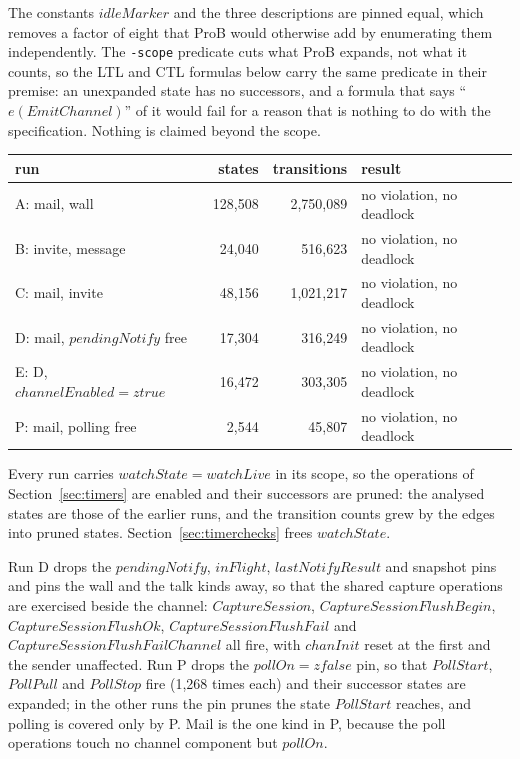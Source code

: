 \documentclass[a4paper,10pt,fleqn]{article}
\begin{document}
The constants $idleMarker$ and the three descriptions are pinned equal, which
removes a factor of eight that ProB would otherwise add by enumerating them
independently.  The \texttt{-scope} predicate cuts what ProB expands, not what
it counts, so the LTL and CTL formulas below carry the same predicate in
their premise: an unexpanded state has no successors, and a formula that
says ``$e(EmitChannel)$'' of it would fail for a reason that is nothing to do
with the specification.  Nothing is claimed beyond the scope.

\begin{center}
\begin{tabular}{lrrl}
  run & states & transitions & result \\ \hline
  A: mail, wall & 128{,}508 & 2{,}750{,}089 & no violation, no deadlock \\
  B: invite, message & 24{,}040 & 516{,}623 & no violation, no deadlock \\
  C: mail, invite & 48{,}156 & 1{,}021{,}217 & no violation, no deadlock \\
  D: mail, $pendingNotify$ free & 17{,}304 & 316{,}249 &
    no violation, no deadlock \\
  E: D, $channelEnabled = ztrue$ & 16{,}472 & 303{,}305 &
    no violation, no deadlock \\
  P: mail, polling free & 2{,}544 & 45{,}807 & no violation, no deadlock \\
\end{tabular}
\end{center}

Every run carries $watchState = watchLive$ in its scope, so the operations of
Section~\ref{sec:timers} are enabled and their successors are pruned: the
analysed states are those of the earlier runs, and the transition counts grew
by the edges into pruned states.  Section~\ref{sec:timerchecks} frees
$watchState$.

Run D drops the $pendingNotify$, $inFlight$, $lastNotifyResult$ and
snapshot pins and pins the wall and the talk kinds away, so that the shared
capture operations are exercised beside the channel: $CaptureSession$,
$CaptureSessionFlushBegin$, $CaptureSessionFlushOk$,
$CaptureSessionFlushFail$ and $CaptureSessionFlushFailChannel$ all fire, with $chanInit$ reset at the first and
the sender unaffected.  Run P drops the $pollOn = zfalse$ pin, so that
$PollStart$, $PollPull$ and $PollStop$ fire (1{,}268 times each) and their
successor states are expanded; in the other runs the pin prunes the state
$PollStart$ reaches, and polling is covered only by P.  Mail is the one kind
in P, because the poll operations touch no channel component but $pollOn$.
\end{document}
